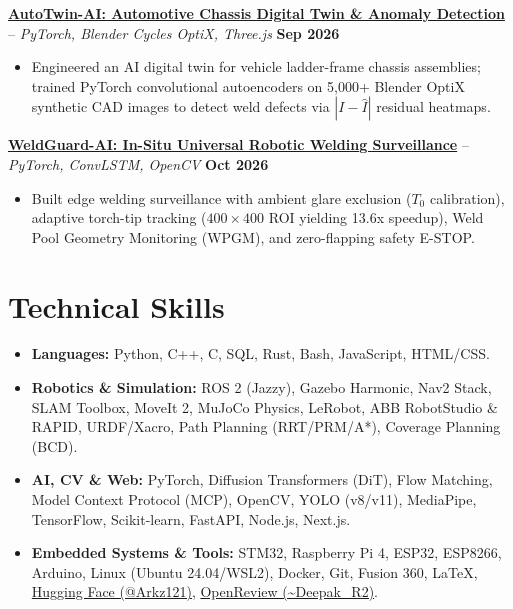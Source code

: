 \documentclass[letterpaper,10pt]{article}
\begin{document}
\noindent
\href{https://github.com/Arkz-Deepak/AutoTwin-AI}{\textbf{AutoTwin-AI: Automotive Chassis Digital Twin \& Anomaly Detection}} -- \textit{PyTorch, Blender Cycles OptiX, Three.js} \hfill \textbf{Sep 2026} \\
\begin{itemize}
    \item Engineered an AI digital twin for vehicle ladder-frame chassis assemblies; trained PyTorch convolutional autoencoders on 5,000+ Blender OptiX synthetic CAD images to detect weld defects via $|I - \hat{I}|$ residual heatmaps.
\end{itemize}
\vspace{3pt}

\noindent
\href{https://github.com/Arkz-Deepak/WeldGuard-AI}{\textbf{WeldGuard-AI: In-Situ Universal Robotic Welding Surveillance}} -- \textit{PyTorch, ConvLSTM, OpenCV} \hfill \textbf{Oct 2026} \\
\begin{itemize}
    \item Built edge welding surveillance with ambient glare exclusion ($T_0$ calibration), adaptive torch-tip tracking ($400\times400$ ROI yielding 13.6x speedup), Weld Pool Geometry Monitoring (WPGM), and zero-flapping safety E-STOP.
\end{itemize}

\section{Technical Skills}
\begin{itemize}
    \item \textbf{Languages:} Python, C++, C, SQL, Rust, Bash, JavaScript, HTML/CSS.
    \item \textbf{Robotics \& Simulation:} ROS 2 (Jazzy), Gazebo Harmonic, Nav2 Stack, SLAM Toolbox, MoveIt 2, MuJoCo Physics, LeRobot, ABB RobotStudio \& RAPID, URDF/Xacro, Path Planning (RRT/PRM/A*), Coverage Planning (BCD).
    \item \textbf{AI, CV \& Web:} PyTorch, Diffusion Transformers (DiT), Flow Matching, Model Context Protocol (MCP), OpenCV, YOLO (v8/v11), MediaPipe, TensorFlow, Scikit-learn, FastAPI, Node.js, Next.js.
    \item \textbf{Embedded Systems \& Tools:} STM32, Raspberry Pi 4, ESP32, ESP8266, Arduino, Linux (Ubuntu 24.04/WSL2), Docker, Git, Fusion 360, \LaTeX, \href{https://huggingface.co/Arkz121}{Hugging Face (@Arkz121)}, \href{https://openreview.net/profile?id=~Deepak_R2}{OpenReview (\textasciitilde Deepak\_R2)}.
\end{itemize}
\end{document}
